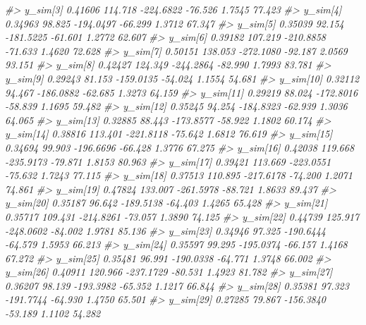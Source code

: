 \documentclass[
  10pt,
  italian,
  a4paper,
  extrafontsizes,onecolumn,openright
  ]{memoir}
\newenvironment{Shaded}{\begin{snugshade}}{\end{snugshade}}
\newcommand{\CommentTok}[1]{\textcolor[rgb]{0.56,0.35,0.01}{\textit{#1}}}
\begin{document}
\begin{Shaded}
\begin{Highlighting}[]
\CommentTok{\#\textgreater{}   y\_sim[3]    0.41606 114.718 {-}224.6822 {-}76.526  1.7545 77.423}
\CommentTok{\#\textgreater{}   y\_sim[4]    0.34963  98.825 {-}194.0497 {-}66.299  1.3712 67.347}
\CommentTok{\#\textgreater{}   y\_sim[5]    0.35039  92.154 {-}181.5225 {-}61.601  1.2772 62.607}
\CommentTok{\#\textgreater{}   y\_sim[6]    0.39182 107.219 {-}210.8858 {-}71.633  1.4620 72.628}
\CommentTok{\#\textgreater{}   y\_sim[7]    0.50151 138.053 {-}272.1080 {-}92.187  2.0569 93.151}
\CommentTok{\#\textgreater{}   y\_sim[8]    0.42427 124.349 {-}244.2864 {-}82.990  1.7993 83.781}
\CommentTok{\#\textgreater{}   y\_sim[9]    0.29243  81.153 {-}159.0135 {-}54.024  1.1554 54.681}
\CommentTok{\#\textgreater{}   y\_sim[10]   0.32112  94.467 {-}186.0882 {-}62.685  1.3273 64.159}
\CommentTok{\#\textgreater{}   y\_sim[11]   0.29219  88.024 {-}172.8016 {-}58.839  1.1695 59.482}
\CommentTok{\#\textgreater{}   y\_sim[12]   0.35245  94.254 {-}184.8323 {-}62.939  1.3036 64.065}
\CommentTok{\#\textgreater{}   y\_sim[13]   0.32885  88.443 {-}173.8577 {-}58.922  1.1802 60.174}
\CommentTok{\#\textgreater{}   y\_sim[14]   0.38816 113.401 {-}221.8118 {-}75.642  1.6812 76.619}
\CommentTok{\#\textgreater{}   y\_sim[15]   0.34694  99.903 {-}196.6696 {-}66.428  1.3776 67.275}
\CommentTok{\#\textgreater{}   y\_sim[16]   0.42038 119.668 {-}235.9173 {-}79.871  1.8153 80.963}
\CommentTok{\#\textgreater{}   y\_sim[17]   0.39421 113.669 {-}223.0551 {-}75.632  1.7243 77.115}
\CommentTok{\#\textgreater{}   y\_sim[18]   0.37513 110.895 {-}217.6178 {-}74.200  1.2071 74.861}
\CommentTok{\#\textgreater{}   y\_sim[19]   0.47824 133.007 {-}261.5978 {-}88.721  1.8633 89.437}
\CommentTok{\#\textgreater{}   y\_sim[20]   0.35187  96.642 {-}189.5138 {-}64.403  1.4265 65.428}
\CommentTok{\#\textgreater{}   y\_sim[21]   0.35717 109.431 {-}214.8261 {-}73.057  1.3890 74.125}
\CommentTok{\#\textgreater{}   y\_sim[22]   0.44739 125.917 {-}248.0602 {-}84.002  1.9781 85.136}
\CommentTok{\#\textgreater{}   y\_sim[23]   0.34946  97.325 {-}190.6444 {-}64.579  1.5953 66.213}
\CommentTok{\#\textgreater{}   y\_sim[24]   0.35597  99.295 {-}195.0374 {-}66.157  1.4168 67.272}
\CommentTok{\#\textgreater{}   y\_sim[25]   0.35481  96.991 {-}190.0338 {-}64.771  1.3748 66.002}
\CommentTok{\#\textgreater{}   y\_sim[26]   0.40911 120.966 {-}237.1729 {-}80.531  1.4923 81.782}
\CommentTok{\#\textgreater{}   y\_sim[27]   0.36207  98.139 {-}193.3982 {-}65.352  1.1217 66.844}
\CommentTok{\#\textgreater{}   y\_sim[28]   0.35381  97.323 {-}191.7744 {-}64.930  1.4750 65.501}
\CommentTok{\#\textgreater{}   y\_sim[29]   0.27285  79.867 {-}156.3840 {-}53.189  1.1102 54.282}

\end{Highlighting}
\end{Shaded}
\end{document}
